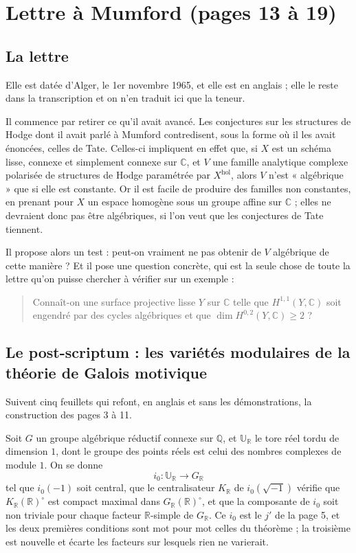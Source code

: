 \documentclass[11pt,a4paper]{article}
\begin{document}
\section*{Lettre à Mumford (pages 13 à 19)}

\subsection*{La lettre}

Elle est datée d'Alger, le 1er novembre 1965, et elle est en anglais ; elle
le reste dans la transcription et on n'en traduit ici que la teneur.

Il commence par retirer ce qu'il avait avancé. Les conjectures sur les
structures de Hodge dont il avait parlé à Mumford contredisent, sous la forme
où il les avait énoncées, celles de Tate. Celles-ci impliquent en effet que,
si $X$ est un schéma lisse, connexe et simplement connexe sur $\mathbb{C}$, et
$V$ une famille analytique complexe polarisée de structures de Hodge
paramétrée par $X^{\mathrm{hol}}$, alors $V$ n'est « algébrique » que si elle
est constante. Or il est facile de produire des familles non constantes, en
prenant pour $X$ un espace homogène sous un groupe affine sur $\mathbb{C}$ ;
elles ne devraient donc pas être algébriques, si l'on veut que les conjectures
de Tate tiennent.

Il propose alors un test : peut-on vraiment ne pas obtenir de $V$ algébrique de
cette manière ? Et il pose une question concrète, qui est la seule chose de
toute la lettre qu'on puisse chercher à vérifier sur un exemple :

\begin{quote}
Connaît-on une surface projective lisse $Y$ sur $\mathbb{C}$ telle que
$H^{1,1}(Y, \mathbb{C})$ soit engendré par des cycles algébriques et que
$\dim H^{0,2}(Y, \mathbb{C}) \geqslant 2$ ?
\end{quote}

\subsection*{Le post-scriptum : les variétés modulaires de la théorie de Galois motivique}

Suivent cinq feuillets qui refont, en anglais et sans les démonstrations, la
construction des pages 3 à 11.

Soit $G$ un groupe algébrique réductif connexe sur $\mathbb{Q}$, et
$\mathbb{U}_{\mathbb{R}}$ le tore réel tordu de dimension $1$, dont le groupe
des points réels est celui des nombres complexes de module $1$. On se donne
\[
i_{0} : \mathbb{U}_{\mathbb{R}} \longrightarrow G_{\mathbb{R}}
\]
tel que $i_{0}(-1)$ soit central, que le centralisateur $K_{\mathbb{R}}$ de
$i_{0}(\sqrt{-1})$ vérifie que $K_{\mathbb{R}}(\mathbb{R})^{\circ}$ est compact
maximal dans $G_{\mathbb{R}}(\mathbb{R})^{\circ}$, et que la composante de
$i_{0}$ soit non triviale pour chaque facteur $\mathbb{R}$-simple de
$G_{\mathbb{R}}$. Ce $i_{0}$ est le $j'$ de la page 5, et les deux
premières conditions sont mot pour mot celles du théorème ; la troisième est
nouvelle et écarte les facteurs sur lesquels rien ne varierait.
\end{document}

